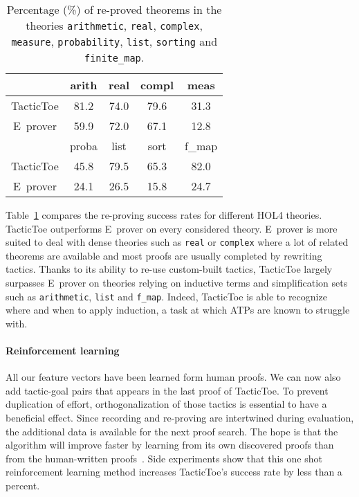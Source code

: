 \documentclass[runningheads,a4paper,draft]{svjour3}
\def\holfour{\textsf{HOL4}\xspace}
\def\eprover{\textsf{E~prover}\xspace}
\def\tactictoe{\textsf{TacticToe}\xspace}
\begin{document}
\begin{table}[]
\centering
\setlength{\tabcolsep}{3mm}
\begin{tabular}{@{}ccccc@{}}
\toprule
\phantom{ab} & {arith} & {real} & {compl} & {meas} \\
\midrule
\tactictoe & 81.2 & 74.0 & 79.6 & 31.3\\
\eprover & 59.9 & 72.0 & 67.1 & 12.8\\
\midrule
\phantom{abc} & {proba} & {list} & {sort} & {f\_map} \\
\midrule
\tactictoe & 45.8 & 79.5 & 65.3 & 82.0 \\
\eprover & 24.1 & 26.5 & 15.8 & 24.7 \\
\bottomrule
\end{tabular}
\caption{\label{theories} Percentage (\%) of re-proved theorems in the theories
\texttt{arithmetic}, \texttt{real}, \texttt{complex}, \texttt{measure},
\texttt{probability}, \texttt{list}, \texttt{sorting} and \texttt{finite\_map}.
}
\end{table}

Table~\ref{theories} compares the re-proving success rates for different
\holfour theories. \tactictoe outperforms \eprover on every
considered theory.
\eprover is more suited to deal with dense theories such as
\texttt{real} or \texttt{complex} where a lot of related theorems are available
and most proofs are usually completed by rewriting tactics. Thanks to its
ability to re-use custom-built tactics, \tactictoe
largely surpasses \eprover on theories relying on inductive terms and
simplification sets such as \texttt{arithmetic}, \texttt{list}
and \texttt{f\_map}. Indeed, \tactictoe is able to recognize where and when to
apply induction, a task at which ATPs are known to struggle with.

\paragraph{Reinforcement learning}
All our feature vectors have been learned form human proofs. We can now
also add tactic-goal pairs that appears in the last proof of \tactictoe. To
prevent
duplication of effort, orthogonalization of those
tactics is essential to have a beneficial effect.
Since recording and re-proving are intertwined during evaluation, the
additional data is available for the next proof search.
The hope is that the algorithm will improve faster by learning from its own
discovered proofs than from the human-written proofs~\cite{DBLP:conf/cade/Urban07}. Side experiments show that
this one shot reinforcement learning method increases \tactictoe's success rate
by less than a percent.
\end{document}
